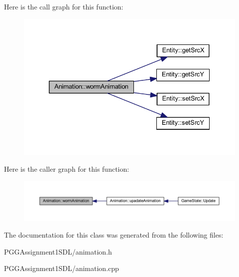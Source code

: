 Here is the call graph for this function\+:
\nopagebreak
\begin{figure}[H]
\begin{center}
\leavevmode
\includegraphics[width=332pt]{class_animation_a28698eae748a6bcac0bbbafb1c62f32b_cgraph}
\end{center}
\end{figure}




Here is the caller graph for this function\+:
\nopagebreak
\begin{figure}[H]
\begin{center}
\leavevmode
\includegraphics[width=350pt]{class_animation_a28698eae748a6bcac0bbbafb1c62f32b_icgraph}
\end{center}
\end{figure}




The documentation for this class was generated from the following files\+:\begin{DoxyCompactItemize}
\item 
P\+G\+G\+Assignment1\+S\+D\+L/animation.\+h\item 
P\+G\+G\+Assignment1\+S\+D\+L/animation.\+cpp\end{DoxyCompactItemize}
